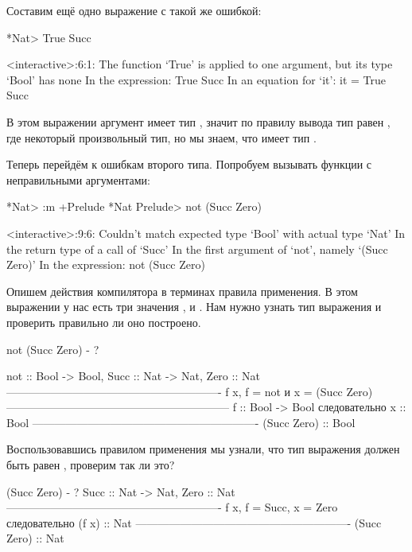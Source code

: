 Составим ещё одно выражение с такой же ошибкой:

\begin{code}
*Nat> True Succ

<interactive>:6:1:
    The function `True' is applied to one argument,
    but its type `Bool' has none
    In the expression: True Succ
    In an equation for `it': it = True Succ
\end{code}

В этом выражении аргумент  имеет тип ,
значит по правилу вывода тип  равен ,
где  некоторый произвольный тип, но мы знаем, что
 имеет тип . 

Теперь перейдём к ошибкам второго типа. Попробуем вызывать
функции с неправильными аргументами:

\begin{code}
*Nat> :m +Prelude
*Nat Prelude> not (Succ Zero)

<interactive>:9:6:
    Couldn't match expected type `Bool' with actual type `Nat'
    In the return type of a call of `Succ'
    In the first argument of `not', namely `(Succ Zero)'
    In the expression: not (Succ Zero)
\end{code}

Опишем действия компилятора в терминах правила применения.
В этом выражении у нас есть три значения ,  и
. Нам нужно узнать тип выражения и проверить правильно
ли оно построено.  

\begin{code}
not (Succ Zero) - ? 

     not :: Bool -> Bool,    Succ :: Nat -> Nat,    Zero :: Nat
     ----------------------------------------------------------
            f x, f = not и x = (Succ Zero)
    ------------------------------------------------------------
            f :: Bool -> Bool следовательно x :: Bool
    -------------------------------------------------------------
            (Succ Zero) :: Bool
\end{code}

Воспользовавшись правилом применения мы узнали, что тип
выражения  должен быть равен , 
проверим так ли это?

\begin{code}
(Succ Zero) - ?
        Succ :: Nat -> Nat,     Zero :: Nat
     ----------------------------------------------------------
            f x, f = Succ, x = Zero следовательно (f x) :: Nat
     ----------------------------------------------------------
                        (Succ Zero) :: Nat
\end{code}

